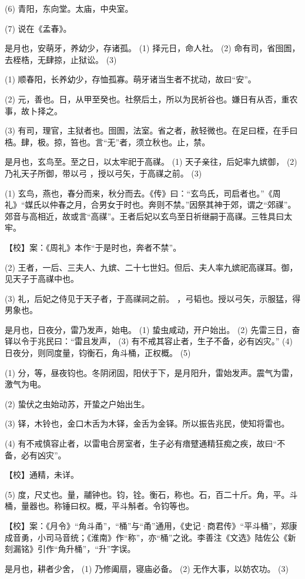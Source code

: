 \documentclass[12pt,UTF8]{ctexbook}
\begin{document}
(6) 青阳，东向堂。太庙，中央室。

(7) 说在《孟春》。

是月也，安萌牙，养幼少，存诸孤。 (1) 择元日，命人社。 (2) 命有司，省囹圄，去桎梏，无肆掠，止狱讼。 (3)

(1) 顺春阳，长养幼少，存恤孤寡。萌牙诸当生者不扰动，故曰“安”。

(2) 元，善也。日，从甲至癸也。社祭后土，所以为民祈谷也。嫌日有从否，重农事，故卜择之。

(3) 有司，理官，主狱者也。囹圄，法室。省之者，赦轻微也。在足曰桎，在手曰梏。肆，极。掠，笞也。言“无”者，须立秋也。止，禁。

是月也，玄鸟至。至之日，以太牢祀于高禖。 (1) 天子亲往，后妃率九嫔御， (2) 乃礼天子所御，带以弓 ，授以弓矢，于高禖之前。 (3)

(1) 玄鸟，燕也，春分而来，秋分而去。《传》曰：“玄鸟氏，司启者也。”《周礼》“媒氏以仲春之月，合男女于时也。奔则不禁。”因祭其神于郊，谓之“郊禖”。郊音与高相近，故或言“高禖”。王者后妃以玄鸟至日祈继嗣于高禖。三牲具曰太牢。

【校】案：《周礼》本作“于是时也，奔者不禁”。

(2) 王者，一后、三夫人、九嫔、二十七世妇。但后、夫人率九嫔祀高禖耳。御，见天子于高禖中也。

(3) 礼，后妃之侍见于天子者，于高禖祠之前。 ，弓韬也。授以弓矢，示服猛，得男象也。

是月也，日夜分，雷乃发声，始电。 (1) 蛰虫咸动，开户始出。 (2) 先雷三日，奋铎以令于兆民曰：“雷且发声， (3) 有不戒其容止者，生子不备，必有凶灾。” (4) 日夜分，则同度量，钧衡石，角斗桶，正权概。 (5)

(1) 分，等，昼夜钧也。冬阴闭固，阳伏于下，是月阳升，雷始发声。震气为雷，激气为电。

(2) 蛰伏之虫始动苏，开蛰之户始出生。

(3) 铎，木铃也，金口木舌为木铎，金舌为金铎。所以振告兆民，使知将雷也。

(4) 有不戒慎容止者，以雷电合房室者，生子必有瘖躄通精狂痴之疾，故曰“不备，必有凶灾”。

【校】通精，未详。

(5) 度，尺丈也。量，鬴钟也。钧，铨。衡石，称也。石，百二十斤。角，平。斗桶，量器也。称锤曰权。概，平斗斛者。令钧等也。

【校】案：《月令》“角斗甬”，“桶”与“甬”通用，《史记·商君传》“平斗桶”，郑康成音勇，小司马音统；《淮南》作“称”，亦“桶”之讹。李善注《文选》陆佐公《新刻漏铭》引作“角升桶”，“升”字误。

是月也，耕者少舍， (1) 乃修阖扇，寝庙必备。 (2) 无作大事，以妨农功。 (3)
\end{document}
